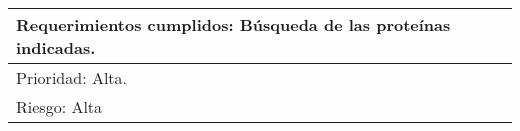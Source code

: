 \begin{longtable}{|l|l|}
\multicolumn{2}{|l|}{Requerimientos cumplidos: Búsqueda de las proteínas indicadas.}                                                                                                                                                                                                           \\ \hline
\multicolumn{2}{|l|}{Prioridad: Alta.}                                                                                                                                                                                                                                                         \\ \hline
\multicolumn{2}{|l|}{Riesgo: Alta}                                                                                                                                                                                                                                                             \\ \hline
\end{longtable}